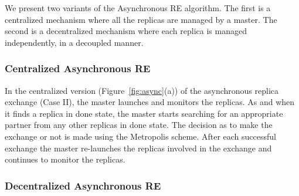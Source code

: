 \documentclass[a4paper,10pt]{article}
\newcommand{\alnote}[1]{ {\textcolor{blue} { ***andre: #1 }}}
\newcommand{\athotanote}[1]{ {\textcolor{green} { ***athota: #1 }}}
\newcommand{\alnote}[1]{}
\newcommand{\athotanote}[1]{}
\begin{document}
We present two variants of the Asynchronous RE algorithm. The first is a centralized 
mechanism where all the replicas are managed by a master. %
The second is a decentralized mechanism where each replica is managed independently, in a decoupled manner.%


\subsubsection{Centralized Asynchronous RE}



In the centralized version (Figure~\ref{fig:async}(a)) of the asynchronous replica exchange (Case II), the master launches and monitors the replicas. As and when it finds a replica in done state, the master starts searching for an appropriate partner from any other replicas in done state. The decision as to make the exchange or not is made using the Metropolis scheme.  %
After each successful exchange the master re-launches the replicas involved in the exchange and continues to monitor the replicas.

\subsubsection{Decentralized Asynchronous RE}
\end{document}
